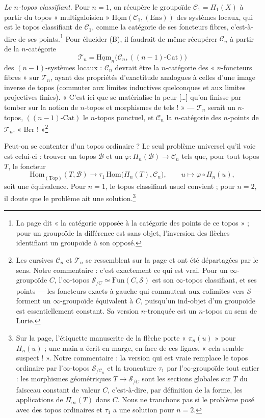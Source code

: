 \documentclass[11pt,a4paper]{article}
\begin{document}
\emph{Le $n$-topos classifiant.} Pour $n = 1$, on récupère le groupoïde
$\mathcal{C}_1 = \Pi_1(X)$ à partir du topos « multigaloisien »
$\underline{\mathrm{Hom}}(\mathcal{C}_1,(\mathrm{Ens}))$ des systèmes locaux,
qui est le topos classifiant de $\mathcal{C}_1$, comme la catégorie de ses
foncteurs fibres, c'est-à-dire de ses points.\footnote{La page dit « la
catégorie opposée à la catégorie des points de ce topos » ; pour un groupoïde
la différence est sans objet, l'inversion des flèches identifiant un
groupoïde à son opposé.} Pour élucider (B), il faudrait de même récupérer
$\mathcal{C}_n$ à partir de la $n$-catégorie
\[
\mathcal{T}_n = \underline{\mathrm{Hom}}_n\bigl(\mathcal{C}_n,((n-1)\text{-}\mathrm{Cat})\bigr)
\]
des $(n-1)$-systèmes locaux : $\mathcal{C}_n$ devrait être la
$n$-catégorie des « $n$-foncteurs fibres » sur $\mathcal{T}_n$, ayant des
propriétés d'exactitude analogues à celles d'une image inverse de topos
(commuter aux limites inductives quelconques et aux limites projectives
finies). « C'est ici que se matérialise la peur […] qu'on finisse par tomber
sur la notion de $n$-topos et morphismes de tels ! » --- $\mathcal{T}_n$
serait un $n$-topos, $((n-1)\text{-}\mathrm{Cat})$ le $n$-topos ponctuel, et
$\mathcal{C}_n$ la $n$-catégorie des $n$-points de $\mathcal{T}_n$.
« Brr ! »\footnote{Les cursives $\mathcal{C}_n$ et $\mathcal{T}_n$ se
ressemblent sur la page et ont été départagées par le sens. Notre
commentaire : c'est exactement ce qui est vrai. Pour un $\infty$-groupoïde
$C$, l'$\infty$-topos $\mathcal{S}_{/C} \simeq \mathrm{Fun}(C,\mathcal{S})$
est son $\infty$-topos classifiant, et ses points --- les foncteurs exacts
à gauche qui commutent aux colimites vers $\mathcal{S}$ --- forment un
$\infty$-groupoïde équivalent à $C$, puisqu'un ind-objet d'un groupoïde est
essentiellement constant. Sa version $n$-tronquée est un $n$-topos au sens
de Lurie.}

Peut-on se contenter d'un topos ordinaire ? Le seul problème universel qu'il
voie est celui-ci : trouver un topos $\mathcal{B}$ et un
$\varphi : \Pi_n(\mathcal{B}) \to \mathcal{C}_n$ tels que, pour tout topos
$T$, le foncteur
\[
\underline{\mathrm{Hom}}_{(\mathrm{Top})}(T,\mathcal{B}) \longrightarrow
\tau_1\,\underline{\mathrm{Hom}}\bigl(\Pi_n(T),\mathcal{C}_n\bigr), \qquad
u \longmapsto \varphi\circ\Pi_n(u),
\]
soit une équivalence. Pour $n = 1$, le topos classifiant usuel convient ;
pour $n = 2$, il doute que le problème ait une solution.\footnote{Sur la
page, l'étiquette manuscrite de la flèche porte « $\pi_n(u)$ » pour
$\Pi_n(u)$ ; une main a écrit en marge, en face de ces lignes, « cela semble
suspect ! ». Notre commentaire : la version qui est vraie remplace le topos
ordinaire par l'$\infty$-topos $\mathcal{S}_{/\mathcal{C}_n}$ et la
troncature $\tau_1$ par l'$\infty$-groupoïde tout entier : les morphismes
géométriques $T \to \mathcal{S}_{/C}$ sont les sections globales sur $T$ du
faisceau constant de valeur $C$, c'est-à-dire, par définition de la forme,
les applications de $\Pi_\infty(T)$ dans $C$. Nous ne tranchons pas si le
problème posé avec des topos ordinaires et $\tau_1$ a une solution pour
$n = 2$.}
\end{document}
